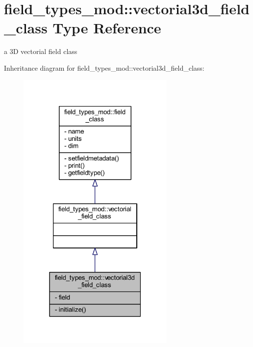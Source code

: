 \hypertarget{structfield__types__mod_1_1vectorial3d__field__class}{}\section{field\+\_\+types\+\_\+mod\+:\+:vectorial3d\+\_\+field\+\_\+class Type Reference}
\label{structfield__types__mod_1_1vectorial3d__field__class}


a 3D vectorial field class  




Inheritance diagram for field\+\_\+types\+\_\+mod\+:\+:vectorial3d\+\_\+field\+\_\+class\+:
\nopagebreak
\begin{figure}[H]
\begin{center}
\leavevmode
\includegraphics[width=219pt]{structfield__types__mod_1_1vectorial3d__field__class__inherit__graph}
\end{center}
\end{figure}


